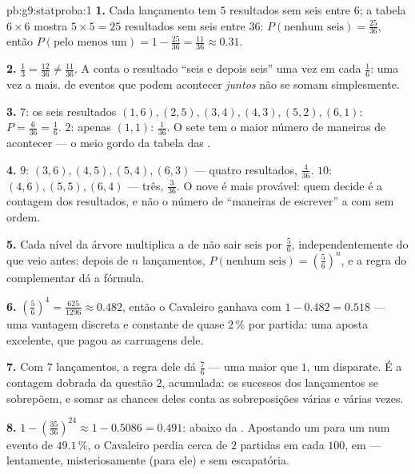 \begin{solution}{pb:g9:statproba:1}
\textbf{1.} Cada lançamento tem $5$ resultados sem seis entre $6$; a
tabela $6 \times 6$ mostra $5 \times 5 = 25$ resultados sem seis entre
$36$: $P(\text{nenhum seis}) = \frac{25}{36}$, então
$P(\text{pelo menos um}) = 1 - \frac{25}{36} = \frac{11}{36} \approx
0.31$.

\textbf{2.} $\frac13 = \frac{12}{36} \neq \frac{11}{36}$. A  conta
o resultado ``seis e depois seis'' uma vez em cada $\frac16$: uma vez a
mais.  de eventos que podem acontecer \emph{juntos} não
se somam simplesmente.

\textbf{3.}  $7$: os seis resultados $(1,6), (2,5), (3,4), (4,3),
(5,2), (6,1)$: $P = \frac{6}{36} = \frac16$.  $2$: apenas
$(1,1)$: $\frac{1}{36}$. O sete tem o maior número de maneiras de
acontecer --- o meio gordo da tabela das .

\textbf{4.}  $9$: $(3,6), (4,5), (5,4), (6,3)$ --- quatro
resultados, $\frac{4}{36}$.  $10$: $(4,6), (5,5), (6,4)$ --- três,
$\frac{3}{36}$. O nove é mais provável: quem decide é a contagem dos
resultados, e não o número de ``maneiras de escrever'' a  com 
sem ordem.

\textbf{5.} Cada nível da árvore multiplica a  de não sair
seis por $\frac56$, independentemente do que veio antes: depois de $n$
lançamentos, $P(\text{nenhum seis}) = \left(\frac56\right)^n$, e a
regra do complementar dá a fórmula.

\textbf{6.} $\left(\frac56\right)^4 = \frac{625}{1296} \approx 0.482$,
então o Cavaleiro ganhava com  $1 - 0.482 = 0.518$ --- uma
vantagem discreta e constante de quase $2\,\%$ por partida: uma aposta
excelente, que pagou as carruagens dele.

\textbf{7.} Com $7$ lançamentos, a regra dele dá $\frac76$ --- uma
 maior que $1$, um disparate. É a contagem dobrada da
questão 2, acumulada: os sucessos dos lançamentos se sobrepõem, e somar
as chances deles conta as sobreposições várias e várias vezes.

\textbf{8.} $1 - \left(\frac{35}{36}\right)^{24} \approx 1 - 0.5086 =
0.491$: abaixo da . Apostando um para um num evento de
$49.1\,\%$, o Cavaleiro perdia cerca de $2$ partidas em cada $100$, em
 --- lentamente, misteriosamente (para ele) e sem escapatória.


\end{solution}
